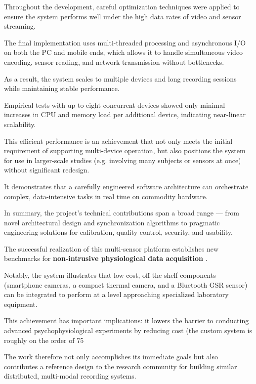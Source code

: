 \begin{itemize}
Throughout the development, careful optimization techniques were applied to ensure the system performs well under the high data rates of video and sensor streaming.

The final implementation uses multi-threaded processing and asynchronous I/O on both the PC and mobile ends, which allows it to handle simultaneous video encoding, sensor reading, and network transmission without bottlenecks.

As a result, the system scales to multiple devices and long recording sessions while maintaining stable performance.

Empirical tests with up to eight concurrent devices showed only minimal increases in CPU and memory load per additional device, indicating near-linear scalability.

This efficient performance is an achievement that not only meets the initial requirement of supporting multi-device operation, but also positions the system for use in larger-scale studies (e.g. involving many subjects or sensors at once) without significant redesign.

It demonstrates that a carefully engineered software architecture can orchestrate complex, data-intensive tasks in real time on commodity hardware.

\end{itemize}

In summary, the project's technical contributions span a broad range --- from novel architectural design and synchronization algorithms to pragmatic engineering solutions for calibration, quality control, security, and usability.

The successful realization of this multi-sensor platform establishes new benchmarks for \textbf{non-intrusive physiological data acquisition}
.

Notably, the system illustrates that low-cost, off-the-shelf components (smartphone cameras, a compact thermal camera, and a Bluetooth GSR sensor) can be integrated to perform at a level approaching specialized laboratory equipment.

This achievement has important implications: it lowers the barrier to conducting advanced psychophysiological experiments by reducing cost (the custom system is roughly on the order of 75%

The work therefore not only accomplishes its immediate goals but also contributes a reference design to the research community for building similar distributed, multi-modal recording systems.

